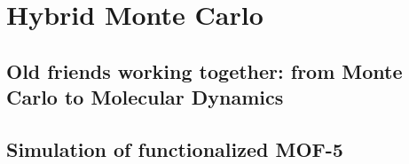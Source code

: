 \documentclass[thesis]{subfiles}
\begin{document}
\chapter{Hybrid Monte Carlo}
\startcontents[chapters]
\printpartialtoc

\section{Old friends working together: from Monte Carlo to Molecular Dynamics}


\section{Simulation of functionalized MOF-5}
\end{document}
